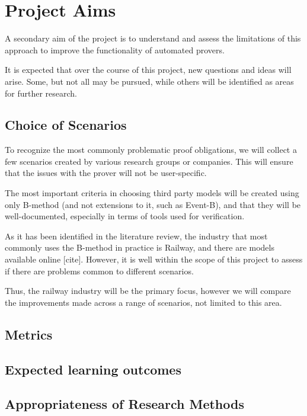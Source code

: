 \documentclass[11pt,journal]{IEEEtran}
\begin{document}
	\section{Project Aims}
	
	A secondary aim of the project is to understand and assess the limitations of this approach to improve the functionality of automated provers.
	
	It is expected that over the course of this project, new questions and ideas will arise. Some, but not all may be pursued, while others will be identified as areas for further research.
	
	\subsection{Choice of Scenarios}
	To recognize the most commonly problematic proof obligations, we will collect a few scenarios created by various research groups or companies. This will ensure that the issues with the prover will not be user-specific. 
	
	The most important criteria in choosing third party models will be created using only B-method (and not extensions to it, such as Event-B), and that they will be well-documented, especially in terms of tools used for verification.
	
	As it has been identified in the literature review, the industry that most commonly uses the B-method in practice is Railway, and there are models available online [cite]. However, it is well within the scope of this project to assess if there are problems common to different scenarios.
	
	Thus, the railway industry will be the primary focus, however we will compare the improvements made across a range of scenarios, not limited to this area.
	
	\subsection{Metrics}
	
	\subsection{Expected learning outcomes}
	
	\subsection{Appropriateness of Research Methods}
	
\end{document}

